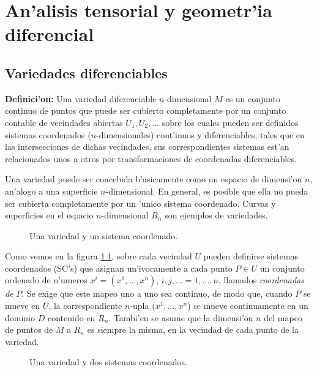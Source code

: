 \chapter{An'alisis tensorial y geometr'ia diferencial}\label{cap:tensores}

\section{Variedades diferenciables}

\textbf{Definici'on:} Una variedad diferenciable $n$-dimensional $M$ es
un conjunto continuo de puntos que puede ser cubierto completamente por un
conjunto contable de vecindades abiertas $U_1, U_2,\dots$ sobre los cuales pueden ser definidos sistemas coordenados ($n$-dimensionales) cont'inuos y diferenciables, tales que en las intersecciones de dichas vecindades, sus correspondientes sistemas est'an relacionados unos a otros por transformaciones de coordenadas diferenciables.

Una variedad puede ser concebida b'asicamente como un espacio de
dimensi'on $n$, an'alogo a una superficie $n$-dimensional. En general,
es posible que ella no pueda ser cubierta completamente por un 'unico sistema coordenado.
Curvas y superficies en el espacio $n$-dimensional $R_n$ son ejemplos de variedades.
\begin{center}
\begin{figure}[H]
\centerline{}
\caption{Una variedad y un sistema coordenado.}
\label{1-1}
\end{figure}
\end{center}

Como vemos en la figura \ref{1-1}, sobre cada vecindad $U$ pueden definirse sistemas coordenados (SC's) que asignan un'ivocamente a cada punto $P\in U$
un conjunto ordenado de n'umeros $x^i=(x^1,\dots ,x^n)$,
$i,j,\dots =1,\dots ,n$, llamados \textit{coordenadas de} $P$. Se exige que este mapeo uno a
uno sea continuo, de modo que, cuando $P$ se mueve en $U$, la correspondiente $n$-upla
($x^1,\dots ,x^n$) se mueve continuamente en un dominio $D$ contenido en $R_n$. Tambi'en se asume que la dimensi'on $n$ del mapeo de puntos de $M$ a $R_n$ es siempre la misma, en la vecindad de cada punto de la variedad.
\begin{center}
\begin{figure}[H]
\centerline{}
\caption{Una variedad y dos sistemas coordenados.}
\label{2-1}
\end{figure}
\end{center}

